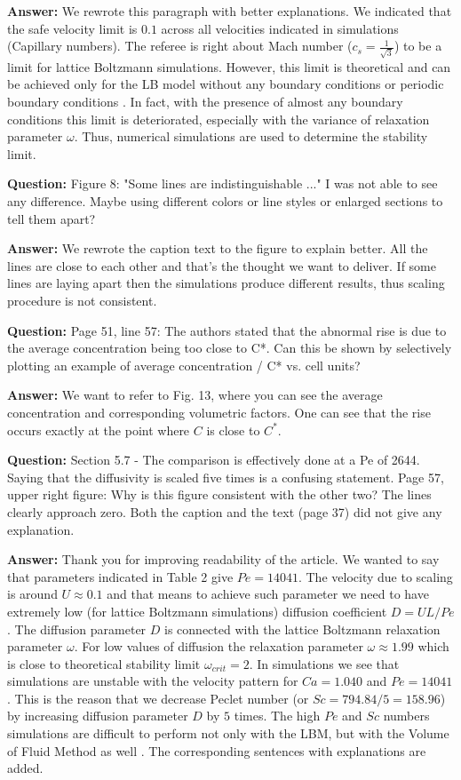\documentclass{article}
\begin{document}
\textbf{Answer:} We rewrote this paragraph with better explanations. We indicated that the safe velocity limit is $0.1$ across all velocities indicated in simulations (Capillary numbers). The referee is right about Mach number ($c_s=\frac{1}{\sqrt{3}}$) to be a limit for lattice Boltzmann simulations. However, this limit is theoretical and can be achieved only for the LB model without any boundary conditions or periodic boundary conditions \cite{kuzmin-stability-optimal}. In fact, with the presence of almost any boundary conditions this limit is deteriorated, especially with the variance of relaxation parameter $\omega$. Thus, numerical simulations are used to determine the stability limit. 

\textbf{Question:} Figure 8: "Some lines are indistinguishable ..." I was not able to see any difference. Maybe using different colors or line styles or enlarged sections to tell them apart?

\textbf{Answer:} We rewrote the caption text to the figure to explain better. All the lines are close to each other and that's the thought we want to deliver. If some lines are laying apart then the simulations produce different results, thus scaling procedure is not consistent. 

\textbf{Question:} Page 51, line 57: The authors stated that the abnormal rise is due to the average concentration being too close to C*. Can this be shown by selectively plotting an example of average concentration / C* vs. cell units?

\textbf{Answer:} We want to refer to Fig. 13, where you can see the average concentration and corresponding volumetric factors. One can see that the rise occurs exactly at the point where $C$ is close to $C^{*}$.

\textbf{Question:} Section 5.7 - The comparison is effectively done at a Pe of 2644. Saying that the diffusivity is scaled five times is a confusing statement. Page 57, upper right figure: Why is this figure consistent with the other two? The lines clearly approach zero. Both the caption and the text (page 37) did not give any explanation.

\textbf{Answer:} Thank you for improving readability of the article. We wanted to say that parameters indicated in Table 2  give $Pe=14041$. The velocity due to scaling is around $U\approx 0.1$ and that means to achieve such parameter we need to have extremely low (for lattice Boltzmann simulations) diffusion coefficient $D=U L / Pe$. The diffusion parameter $D$ is connected with the lattice Boltzmann relaxation parameter $\omega$. For low values of diffusion the relaxation parameter $\omega\approx 1.99$ which is close to theoretical stability limit $\omega_{crit}=2$. In simulations we see that simulations are unstable with the velocity pattern for $Ca=1.040$ and $Pe=14041$. This is the reason that we decrease Peclet number (or $Sc=794.84/5=158.96$)  by increasing diffusion parameter $D$ by $5$ times. The high $Pe$ and $Sc$ numbers simulations are difficult to perform not only with the LBM, but with the Volume of Fluid Method as well \cite{onea-mass}. The corresponding sentences with explanations are added. 
\end{document}
